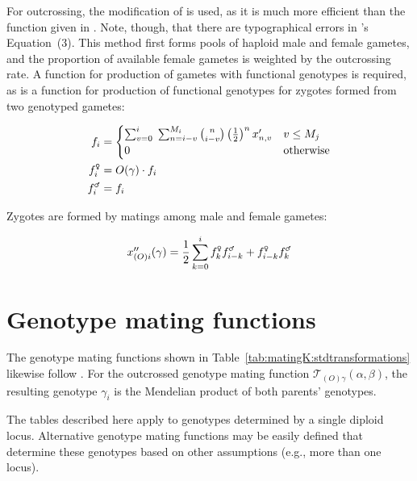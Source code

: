 \documentclass[12pt,twoside,letterpaper,fleqn]{report}
\numberwithin{equation}{section}  %
\newcommand{\gami}{\mbox{$f_{i}$}}
\newcommand{\gammalei}{\mbox{$f_{i}^{\text{\Male}}$}}
\newcommand{\gamfemalei}{\mbox{$f_{i}^{\text{\Female}}$}}
\newcommand{\gammalek}{\mbox{$f_{k}^{\text{\Male}}$}}
\newcommand{\gamfemalek}{\mbox{$f_{k}^{\text{\Female}}$}}
\newcommand{\gammaleik}{\mbox{$f_{i-k}^{\text{\Male}}$}}
\newcommand{\gamfemaleik}{\mbox{$f_{i-k}^{\text{\Female}}$}}
\newcommand{\Mj}{\mbox{$M_{j}$}}
\newcommand{\xpnv}{\mbox{$x'_{n,v}$}}
\newcommand{\xppoig}{\mbox{$x''_{(O)i}(\gamma)$}}
\newcommand{\Og}{\mbox{$O(\gamma)$}}
\newcommand{\TOgab}{\mbox{$\mathcal{T}_{(O)\gamma}(\alpha, \beta)$}}
\begin{document}
{For outcrossing, the modification of \citet{Charlesworth:1990:5337} is used, as
it is much more efficient than the function given in
\citet{Kondrashov:1985:5375}.  Note, though, that there are typographical
errors in \citeauthor{Charlesworth:1990:5337}'s Equation~(3).  This method
first forms pools of haploid male and female gametes, and the proportion of
available female gametes is weighted by the outcrossing rate.  A function for
production of gametes with functional genotypes is required, as is a function
for production of functional genotypes for zygotes formed from two genotyped
gametes:

\begin{align}
\label{eq:Kreproduction:gametes}
\gami    &= \begin{cases}
              \sum_{v=0}^{i}{
                \;  \sum_{n=i-v}^{M_i}{
                \binom{n}{i-v} \left(\frac{1}{2}\right)^{n} \xpnv
              }} & v \le \Mj \\
              0 & \text{otherwise}
            \end{cases} \\
\gamfemalei &= \Og \cdot \gami \\
\gammalei &= \gami
\end{align}

Zygotes are formed by matings among male and female gametes:

\begin{equation}
\label{eq:Kreproduction:zygotes}
\xppoig = \frac{1}{2} \sum_{k=0}^{i}{\gamfemalek\gammaleik+\gamfemaleik\gammalek}
\end{equation}

\section{Genotype mating functions}

The genotype mating functions shown in
Table~\ref{tab:matingK:stdtransformations} likewise follow
\citet{Kondrashov:1985:5375}.  For the outcrossed genotype mating function
\TOgab, the resulting genotype $\gamma_i$ is the Mendelian product of both
parents' genotypes.

The tables described here apply to genotypes determined by a single diploid
locus.  Alternative genotype mating functions may be easily defined that
determine these genotypes based on other assumptions (e.g., more than one
locus).

}
\end{document}
